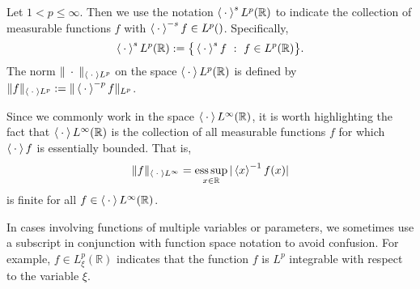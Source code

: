 \documentclass[../dissertation.tex]{subfiles}
\begin{document}
\begin{defn}\label{defn2:wLp}
	Let $1 < p \leq \infty$. Then we use the notation 
	$\left\langle \kern 0.5ex \cdot \kern 0.5ex \right\rangle^s L^p(\mathbb R)$
	to indicate the collection of measurable functions $f$ with 
	$\left\langle \kern 0.5ex \cdot \kern 0.5ex \right\rangle^{-s} f \in L^p(\mathbb)$. Specifically, 
	\[
		\left\langle \kern 0.5ex \cdot \kern 0.5ex \right\rangle^s L^p(\mathbb R) 
			:= \big\{ \left\langle \kern 0.5ex \cdot \kern 0.5ex \right\rangle^s f ~:~ f \in L^p(\mathbb R) \big\}.
	\]
	The norm $\| \kern 0.5ex \cdot \kern 0.5ex \|_{\left\langle \kern 0.5ex \cdot \kern 0.5ex \right\rangle L^p}$ on the space 
	$\left\langle \kern 0.5ex \cdot \kern 0.5ex \right\rangle L^p(\mathbb R)$ is defined by 
	$\| f \|_{\left\langle \kern 0.5ex \cdot \kern 0.5ex \right\rangle L^p}:= \| \left\langle \kern 0.5ex \cdot \kern 0.5ex \right\rangle^{-p} f \|_{L^p}$.
\end{defn}

\begin{rmk}
	Since we commonly work in the space $\left\langle \kern 0.5ex \cdot \kern 0.5ex \right\rangle L^\infty(\mathbb R)$, 
	it is worth highlighting the fact that $\left\langle \kern 0.5ex \cdot \kern 0.5ex \right\rangle L^\infty(\mathbb R)$
	is the collection of all measurable functions $f$ for which
	$\left\langle \kern 0.5ex \cdot \kern 0.5ex \right\rangle f$ is essentially bounded. That is,
	\[
		\| f \|_{\left\langle \kern 0.5ex \cdot \kern 0.5ex \right\rangle L^\infty} 
			= \operatorname*{ess\,sup}_{x\in \mathbb R} | \left\langle x \right\rangle^{-1} f(x) |
	\]
	is finite for all $f \in \left\langle \kern 0.5ex \cdot \kern 0.5ex \right\rangle L^\infty(\mathbb R)$.
\end{rmk}

\begin{rmk}
	In cases involving functions of multiple variables or parameters, we 
	sometimes use a subscript in conjunction with function space notation 
	to avoid confusion. For example, $f \in L_\xi^p(\mathbb R)$ indicates 
	that the function $f$ is $L^p$ integrable with respect to the variable
	$\xi$. 
\end{rmk}
\end{document}

